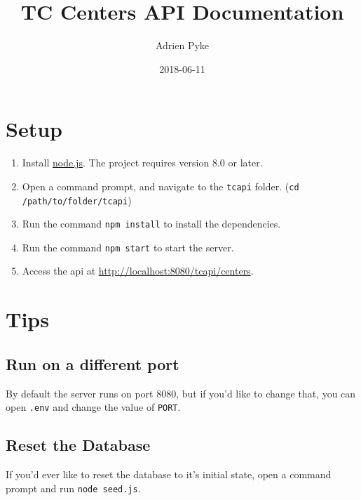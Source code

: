 \documentclass{article}
\title{TC Centers API Documentation}
\date{2018-06-11}
\author{Adrien Pyke}
\begin{document}
	\maketitle
	\newpage

	\section{Setup}
	\begin{enumerate}
		\item Install \href{https://nodejs.org/en/}{node.js}. The project requires version 8.0 or later.
		\item Open a command prompt, and navigate to the \texttt{tcapi} folder. (\texttt{cd /path/to/folder/tcapi})
		\item Run the command \texttt{npm install} to install the dependencies.
		\item Run the command \texttt{npm start} to start the server.
		\item Access the api at \url{http://localhost:8080/tcapi/centers}.
	\end{enumerate}

	\section{Tips}

	\subsection{Run on a different port}
	By default the server runs on port 8080, but if you'd like to change that, you can open \texttt{.env} and change the value of \texttt{PORT}.

	\subsection{Reset the Database}
	If you'd ever like to reset the database to it's initial state, open a command prompt and run \texttt{node seed.js}.

	\newpage
\end{document}
